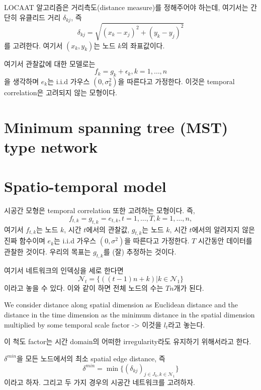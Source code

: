 \documentclass[b5paper,]{book}
\theoremstyle{definition}
\theoremstyle{definition}
\theoremstyle{definition}
\theoremstyle{remark}
\begin{document}
LOCAAT 알고리즘은 거리측도(distance measure)를 정해주어야 하는데,
여기서는 간단히 유클리드 거리 \(\delta_{kj}\), 즉
\[\delta_{kj}=\sqrt{(x_{k}-x_{j})^{2}+(y_{k}-y_{j})^{2}}\] 를 고려한다.
여기서 \((x_{k},y_{k})\)는 노드 \(k\)의 좌표값이다.

여기서 관찰값에 대한 모델로는
\[f_{k}=g_{k}+\epsilon_{k}, k=1,\ldots , n\] 을 생각하며 \(e_{k}\)는
i.i.d 가우스 \((0,\sigma_{k}^{2})\)을 따른다고 가정한다. 이것은 temporal
correlation은 고려되지 않는 모형이다.

\section{Minimum spanning tree (MST) type
network}\label{minimum-spanning-tree-mst-type-network}

\section{Spatio-temporal model}\label{spatio-temporal-model}

시공간 모형은 temporal correlation 또한 고려하는 모형이다. 즉,
\[f_{t,k}=g_{t,k}=e_{t,k}, t=1,\ldots, T, k=1,\ldots , n,\] 여기서
\(f_{t,k}\)는 노드 \(k\), 시간 \(t\)에서의 관찰값, \(g_{t,k}\)는 노드
\(k\), 시간 \(t\)에서의 알려지지 않은 진짜 함수이며 \(e_{k}\)는 i.i.d
가우스 \((0,\sigma^{2})\)을 따른다고 가정한다. \(T\) 시간동안 데이터를
관찰한 것이다. 우리의 목표는 \(g_{t,k}\)를 (잘) 추정하는 것이다.

여기서 네트워크의 인덱싱을 세로 한다면
\[\mathcal{N}_{t}=\{((t-1)n+k)| k \in \mathcal{N}_{1}\}\] 이라고 놓을 수
있다. 이와 같이 하면 전체 노드의 수는 \(Tn\)개가 된다.

We consider distance along spatial dimension as Euclidean distance and
the distance in the time dimension as the minimum distance in the
spatial dimension multiplied by some temporal scale factor
-\textgreater{} 이것을 \(l_{t}\)라고 놓는다.

이 척도 factor는 시간 domain의 어떠한 irregularity라도 유지하기
위해서라고 한다.

\(\delta^{min}\)을 모든 노드에서의 최소 spatial edge distance, 즉
\[\delta^{min}=\min \{ (\delta_{kj})_{j\in J_{k}, k\in \mathcal{N}_{1}}\}\]
이라고 하자. 그리고 두 가지 경우의 시공간 네트워크를 고려하자.
\end{document}
